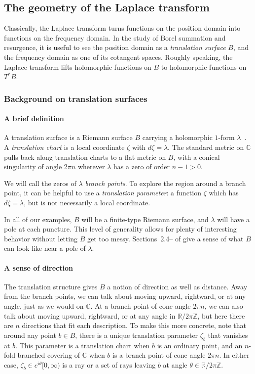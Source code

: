 \documentclass{article}
\newcommand{\Z}{\mathbb{Z}}
\newcommand{\R}{\mathbb{R}}
\newcommand{\C}{\mathbb{C}}
\theoremstyle{definition}
\theoremstyle{plain}
\begin{document}
\subsection{The geometry of the Laplace transform}\label{sec:geometry_laplace}
Classically, the Laplace transform turns functions on the position domain into functions on the frequency domain. In the study of Borel summation and resurgence, it is useful to see the position domain as a {\em translation surface} $B$, and the frequency domain as one of its cotangent spaces. Roughly speaking, the Laplace transform lifts holomorphic functions on $B$ to holomorphic functions on $T^*B$.
%
\subsubsection{Background on translation surfaces}\label{sec:transl}
%
\paragraph{A brief definition}
%
A translation surface is a Riemann surface $B$ carrying a holomorphic $1$-form $\lambda$~\cite{zorich2006flat}. A {\em translation chart} is a local coordinate $\zeta$ with $d\zeta = \lambda$. The standard metric on $\C$ pulls back along translation charts to a flat metric on $B$, with a conical singularity of angle $2\pi n$ wherever $\lambda$ has a zero of order $n-1 > 0$.

We will call the zeros of $\lambda$ {\em branch points}. To explore the region around a branch point, it can be helpful to use a {\em translation parameter}: a function $\zeta$ which has $d\zeta = \lambda$, but is not necessarily a local coordinate.

In all of our examples, $B$ will be a finite-type Riemann surface, and $\lambda$ will have a pole at each puncture. This level of generality allows for plenty of interesting behavior without letting $B$ get too messy. Sections~2.4\;-- of \cite{gupta2013meromorphic} give a sense of what $B$ can look like near a pole of $\lambda$.
%
\paragraph{A sense of direction}
%
The translation structure gives $B$ a notion of direction as well as distance. Away from the branch points, we can talk about moving upward, rightward, or at any angle, just as we would on $\C$. At a branch point of cone angle $2\pi n$, we can also talk about moving upward, rightward, or at any angle in $\R/2\pi\Z$, but here there are $n$ directions that fit each description. To make this more concrete, note that around any point $b \in B$, there is a unique translation parameter $\zeta_b$ that vanishes at $b$. This parameter is a translation chart when $b$ is an ordinary point, and an $n$-fold branched covering of $\C$ when $b$ is a branch point of cone angle $2\pi n$. In either case, $\zeta_b \in e^{i\theta} [0, \infty)$ is a ray or a set of rays leaving $b$ at angle $\theta \in \R/2\pi\Z$.
\end{document}
